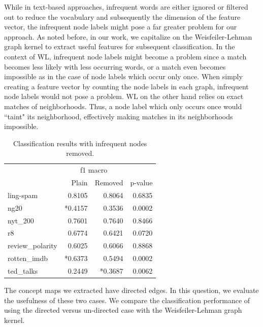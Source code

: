 While in text-based approaches, infrequent words are either ignored or filtered out to reduce the vocabulary and subsequently the dimension of the feature vector, the infrequent node labels might pose a far greater problem for our approach.
As noted before, in our work, we capitalize on the Weisfeiler-Lehman graph kernel to extract useful features for subsequent classification.
In the context of WL, infrequent node labels might become a problem since a match becomes less likely with less occurring words, or a match even becomes impossible as in the case of node labels which occur only once.
When simply creating a feature vector by counting the node labels in each graph, infrequent node labels would not pose a problem.
WL on the other hand relies on exact matches of neighborhoods.
Thus, a node label which only occurs once would ``taint" its neighborhood, effectively making matches in its neighborhoods impossible.

\begin{table}[htb!]
	\centering
	\begin{tabular}{lrrr}
		&  \multicolumn{2}{c}{f1 macro} &   \\
		 &  Plain &  Removed &  p-value \\
		\midrule
			ling-spam       & 0.8105 & 0.8064 & 0.6835 \\
			ng20            & *0.4157 & 0.3536 & 0.0002 \\
			nyt\_200         & 0.7601 & 0.7640 & 0.8466 \\
			r8              & 0.6774 & 0.6421 & 0.0720 \\
			review\_polarity & 0.6025 & 0.6066 & 0.8868 \\
			rotten\_imdb     & *0.6373 & 0.5494 & 0.0002 \\
			ted\_talks       & 0.2449 & *0.3687 & 0.0062 \\
		\bottomrule
	\end{tabular}
	\caption[Results: Remove infrequent node labels]{Classification results with infrequent nodes removed.}\label{table:results_infrequent_nodes}
\end{table}


The concept maps we extracted have directed edges.
In this question, we evaluate the usefulness of these two cases.
We compare the classification performance of using the directed versus un-directed case with the Weisfeiler-Lehman graph kernel.

